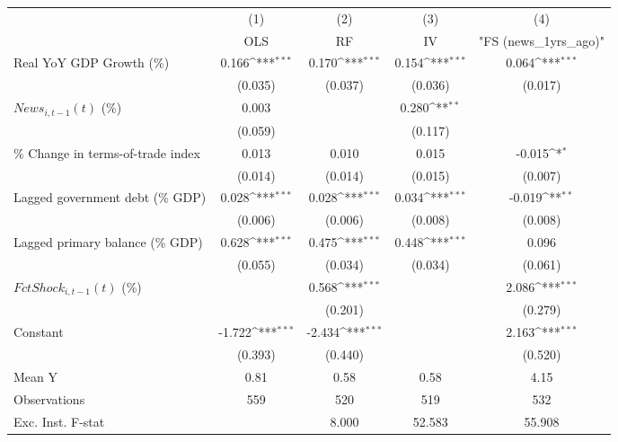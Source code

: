 {
\def\sym#1{\ifmmode^{#1}\else\(^{#1}\)\fi}
\begin{tabular}{l*{4}{c}}
\toprule
                    &\multicolumn{1}{c}{(1)}&\multicolumn{1}{c}{(2)}&\multicolumn{1}{c}{(3)}&\multicolumn{1}{c}{(4)}\\
                    &\multicolumn{1}{c}{OLS}&\multicolumn{1}{c}{RF}&\multicolumn{1}{c}{IV}&\multicolumn{1}{c}{ "FS (news_1yrs_ago)" }\\
\midrule
Real YoY GDP Growth (\%)&       0.166\sym{***}&       0.170\sym{***}&       0.154\sym{***}&       0.064\sym{***}\\
                    &     (0.035)         &     (0.037)         &     (0.036)         &     (0.017)         \\
\addlinespace
$ News_{i,t-1}(t)$ (\%)&       0.003         &                     &       0.280\sym{**} &                     \\
                    &     (0.059)         &                     &     (0.117)         &                     \\
\addlinespace
\% Change in terms-of-trade index&       0.013         &       0.010         &       0.015         &      -0.015\sym{*}  \\
                    &     (0.014)         &     (0.014)         &     (0.015)         &     (0.007)         \\
\addlinespace
Lagged government debt (\% GDP)&       0.028\sym{***}&       0.028\sym{***}&       0.034\sym{***}&      -0.019\sym{**} \\
                    &     (0.006)         &     (0.006)         &     (0.008)         &     (0.008)         \\
\addlinespace
Lagged primary balance (\% GDP)&       0.628\sym{***}&       0.475\sym{***}&       0.448\sym{***}&       0.096         \\
                    &     (0.055)         &     (0.034)         &     (0.034)         &     (0.061)         \\
\addlinespace
$ FctShock_{i,t-1}(t)$ (\%)&                     &       0.568\sym{***}&                     &       2.086\sym{***}\\
                    &                     &     (0.201)         &                     &     (0.279)         \\
\addlinespace
Constant            &      -1.722\sym{***}&      -2.434\sym{***}&                     &       2.163\sym{***}\\
                    &     (0.393)         &     (0.440)         &                     &     (0.520)         \\
\midrule
Mean Y              &        0.81         &        0.58         &        0.58         &        4.15         \\
Observations        &         559         &         520         &         519         &         532         \\
Exc. Inst. F-stat   &                     &       8.000         &      52.583         &      55.908         \\
\bottomrule
\end{tabular}
}
